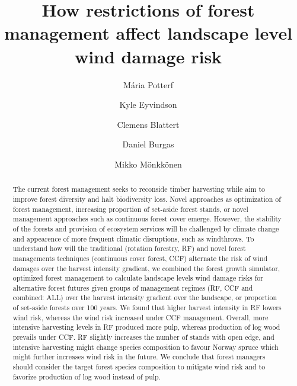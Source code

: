 \documentclass[]{elsarticle} %
\begin{document}
\begin{frontmatter}

  \title{How restrictions of forest management affect landscape level wind damage
risk}
    \author[Department of Biological and Environmental Science]{Mária Potterf}
    \author[Department of Biological and Environmental Science]{Kyle Eyvindson}
    \author[Department of Biological and Environmental Science]{Clemens Blattert}
    \author[Department of Biological and Environmental Science]{Daniel Burgas}
    \author[Department of Biological and Environmental Science]{Mikko Mönkkönen}
      \address[University of Jyvaskyla]{Department of Biological and Environmental Science, University of
Jyvaskyla, P.O. Box 35, FI-40014 Jyvaskyla, Finland}
    \address[Wisdom]{This is wisdom address}
    \address[LUKE]{THIS is Luke address Department, Street, City, State, Zip}
    \cortext[]{}
  
  \begin{abstract}
  The current forest management seeks to reconside timber harvesting while
  aim to improve forest diversity and halt biodiversity loss. Novel
  approaches as optimization of forest management, increasing proportion
  of set-aside forest stands, or novel management approaches such as
  continuous forest cover emerge. However, the stability of the forests
  and provision of ecosystem services will be challenged by climate change
  and appearence of more frequent climatic disruptions, such as
  windthrows. To understand how will the traditional (rotation forestry,
  RF) and novel forest managements techniques (continuous cover forest,
  CCF) alternate the risk of wind damages over the harvest intensity
  gradient, we combined the forest growth simulator, optimized forest
  management to calculate landscape levels wind damage risks for
  alternative forest futures given groups of management regimes (RF, CCF
  and combined: ALL) over the harvest intensity gradient over the
  landscape, or proportion of set-aside forests over 100 years. We found
  that higher harvest intensity in RF lowers wind risk, whereas the wind
  risk increased under CCF management. Overall, more intensive harvesting
  levels in RF produced more pulp, whereas production of log wood prevails
  under CCF. RF slightly increases the number of stands with open edge,
  and intensive harvesting might change species composition to favour
  Norway spruce which might further increases wind risk in the future. We
  conclude that forest managers should consider the target forest species
  composition to mitigate wind risk and to favorize production of log wood
  instead of pulp.
  \end{abstract}
  
 \end{frontmatter}
\end{document}
